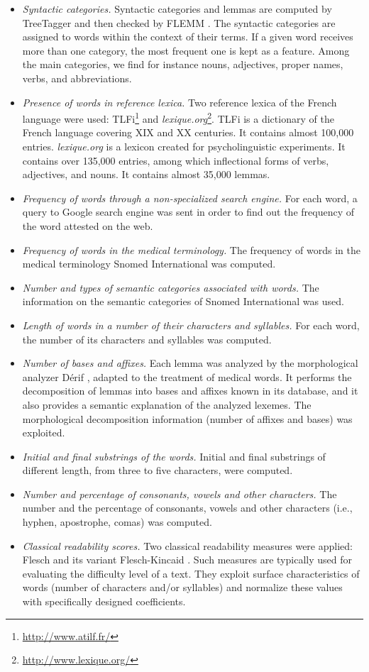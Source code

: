 \begin{itemize}
\item {\it Syntactic categories.}  Syntactic categories and lemmas are
  computed by TreeTagger \citep{Schmid-1994} and then checked by FLEMM
  \citep{Namer-TAL2000}.  The syntactic categories are assigned to words within the context of their terms.  If a given word receives more than one category, the most frequent one is kept as a feature.
  Among the main categories, we find for instance nouns, adjectives,  proper names, verbs, and abbreviations.
\item {\it Presence of words in reference lexica.} Two
  reference lexica of the French language were used:
  TLFi\footnote{\url{http://www.atilf.fr/}} and {\it lexique.org}\footnote{\url{http://www.lexique.org/}}. TLFi is a dictionary of the French language covering XIX and XX
  centuries. It contains almost 100,000 entries. {\it lexique.org} is a lexicon created for psycholinguistic experiments. It contains over
  135,000 entries, among which inflectional forms of verbs, adjectives, and nouns. It contains almost 35,000 lemmas.
\item {\it Frequency of words through a non-specialized search
    engine.} For each word, a query to Google search engine was sent in order to find out the frequency of the word attested on the web.
\item {\it Frequency of words in the medical terminology.} The frequency of words in the medical terminology Snomed International was computed.
\item {\it Number and types of semantic categories associated with words.} The information on the semantic categories of
  Snomed International was used.
\item {\it Length of words in a number of their characters and syllables.} For each word, the number of its characters and syllables was computed.
\item {\it Number of bases and affixes.} Each lemma was analyzed by the morphological analyzer D\'erif \citep{Namer-AMIA2004}, adapted to the treatment of medical words. It performs the decomposition of lemmas into bases and affixes known in its database, and it also provides a semantic explanation of the analyzed lexemes. The morphological decomposition information (number of affixes and bases) was exploited.
\item {\it Initial and final substrings of the words.} Initial and final substrings of different length, from three to five characters, were computed.
\item {\it Number and percentage of consonants, vowels and other
    characters.} The number and the percentage of consonants, vowels and other characters (i.e., hyphen, apostrophe,
  comas) was computed.
\item {\it Classical readability scores.} Two classical readability measures were applied: Flesch \citep{Flesch1948} and its variant Flesch-Kincaid \citep{Kincaid-1975}. Such measures are typically used for evaluating the difficulty level of a text. They exploit surface
  characteristics of words (number of characters and/or syllables) and normalize these values with specifically designed coefficients.
\end{itemize}



